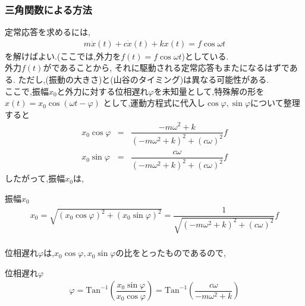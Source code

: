 \documentclass[a4paper]{jsarticle}
\begin{document}
\subsubsection{三角関数による方法}
定常応答を求めるには,
\begin{eqnarray*}
    m \ddot{x}\left(t\right)+c\dot{x}\left(t\right)+kx\left(t\right)=f\cos\omega t
\end{eqnarray*}
を解けばよい.(ここでは,外力を$f\left(t\right)=f\cos\omega t$)としている.\\
外力$f\left(t\right)$がであることから,
それに駆動される定常応答もまたになるはずである.
ただし,(振動の大きさ)と(山谷のタイミング)は異なる可能性がある.\\
ここで,振幅$x_0$と外力に対する位相遅れ$\varphi$を未知量として,特殊解の形を$x\left(t\right)=x_0\cos\left(\omega t-\varphi\right)$
として,運動方程式に代入し$\cos\varphi,\sin\varphi$について整理すると
\begin{eqnarray*}
    x_0\cos\varphi&=&\dfrac{-m\omega^2+k}{\left(-m\omega^2+k\right)^2+\left(c\omega\right)^2}f\\
    x_0\sin\varphi&=&\dfrac{c\omega}{\left(-m\omega^2+k\right)^2+\left(c\omega\right)^2}f
\end{eqnarray*}
したがって,振幅$x_0$は,
\begin{itembox}[l]{振幅$x_0$}
    \begin{eqnarray*}
        x_0=\sqrt{\left(x_0\cos\varphi\right)^2+\left(x_0\sin\varphi\right)^2}=\dfrac{1}{\sqrt{\left(-m\omega^2+k\right)^2+\left(c\omega\right)^2}}f\\
    \end{eqnarray*}
\end{itembox}
位相遅れ$\varphi$は,$x_0\cos\varphi,x_0\sin\varphi$の比をとったものであるので,
\begin{itembox}[l]{位相遅れ$\varphi$}
    \begin{eqnarray*}
        \varphi=\mathrm{Tan}^{-1}\left(\dfrac{x_0\sin\varphi}{x_0\cos\varphi}\right)=\mathrm{Tan}^{-1}\left(\dfrac{c\omega}{-m\omega^2+k}\right)\\
    \end{eqnarray*}
\end{itembox}
\end{document}
